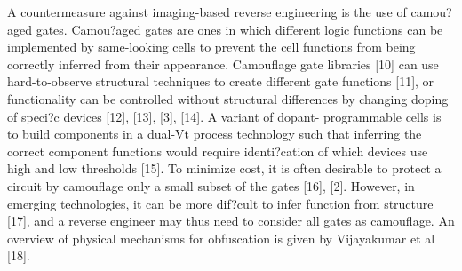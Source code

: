 \documentclass[proposal]{umassthesis}  %
\begin{document}
A countermeasure against imaging-based reverse engineering is the use of camou?aged gates. Camou?aged gates are ones in which different logic functions can be implemented by same-looking cells to prevent the cell functions from being correctly inferred from their appearance. Camouflage gate libraries [10] can use hard-to-observe structural techniques to create different gate functions [11], or functionality can be controlled without structural differences by changing doping of speci?c devices [12], [13], [3], [14]. A variant of dopant- programmable cells is to build components in a dual-Vt process technology such that inferring the correct component functions would require identi?cation of which devices use high and low thresholds [15]. To minimize cost, it is often desirable to protect a circuit by camouflage only a small subset of the gates [16], [2]. However, in emerging technologies, it can be more dif?cult to infer function from structure [17], and a reverse engineer may thus need to consider all gates as camouflage.  An overview of physical mechanisms for obfuscation is given by Vijayakumar et al [18].
\end{document}
